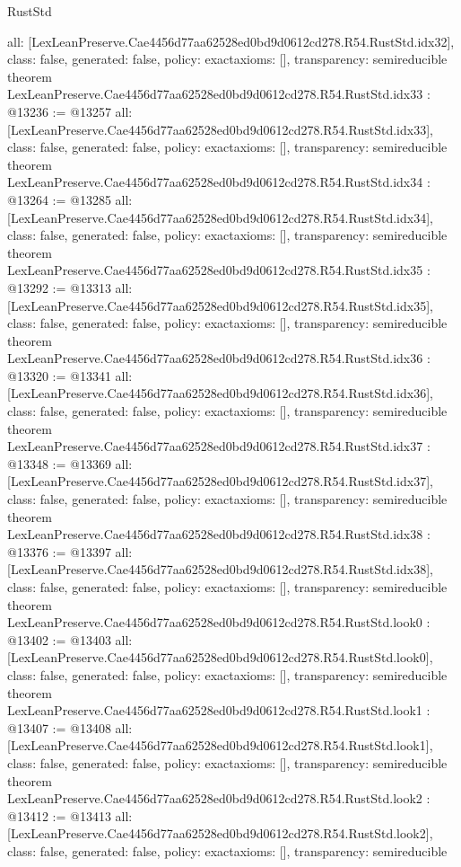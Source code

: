 \begin{lexlean}{RustStd}
\begin{coremodule}
{  all: [LexLeanPreserve.Cae4456d77aa62528ed0bd9d0612cd278.R54.RustStd.idx32],
  class: false,
  generated: false,
  policy: exact{axioms: []},
  transparency: semireducible
}
theorem LexLeanPreserve.Cae4456d77aa62528ed0bd9d0612cd278.R54.RustStd.idx33 : @13236 := @13257 {
  all: [LexLeanPreserve.Cae4456d77aa62528ed0bd9d0612cd278.R54.RustStd.idx33],
  class: false,
  generated: false,
  policy: exact{axioms: []},
  transparency: semireducible
}
theorem LexLeanPreserve.Cae4456d77aa62528ed0bd9d0612cd278.R54.RustStd.idx34 : @13264 := @13285 {
  all: [LexLeanPreserve.Cae4456d77aa62528ed0bd9d0612cd278.R54.RustStd.idx34],
  class: false,
  generated: false,
  policy: exact{axioms: []},
  transparency: semireducible
}
theorem LexLeanPreserve.Cae4456d77aa62528ed0bd9d0612cd278.R54.RustStd.idx35 : @13292 := @13313 {
  all: [LexLeanPreserve.Cae4456d77aa62528ed0bd9d0612cd278.R54.RustStd.idx35],
  class: false,
  generated: false,
  policy: exact{axioms: []},
  transparency: semireducible
}
theorem LexLeanPreserve.Cae4456d77aa62528ed0bd9d0612cd278.R54.RustStd.idx36 : @13320 := @13341 {
  all: [LexLeanPreserve.Cae4456d77aa62528ed0bd9d0612cd278.R54.RustStd.idx36],
  class: false,
  generated: false,
  policy: exact{axioms: []},
  transparency: semireducible
}
theorem LexLeanPreserve.Cae4456d77aa62528ed0bd9d0612cd278.R54.RustStd.idx37 : @13348 := @13369 {
  all: [LexLeanPreserve.Cae4456d77aa62528ed0bd9d0612cd278.R54.RustStd.idx37],
  class: false,
  generated: false,
  policy: exact{axioms: []},
  transparency: semireducible
}
theorem LexLeanPreserve.Cae4456d77aa62528ed0bd9d0612cd278.R54.RustStd.idx38 : @13376 := @13397 {
  all: [LexLeanPreserve.Cae4456d77aa62528ed0bd9d0612cd278.R54.RustStd.idx38],
  class: false,
  generated: false,
  policy: exact{axioms: []},
  transparency: semireducible
}
theorem LexLeanPreserve.Cae4456d77aa62528ed0bd9d0612cd278.R54.RustStd.look0 : @13402 := @13403 {
  all: [LexLeanPreserve.Cae4456d77aa62528ed0bd9d0612cd278.R54.RustStd.look0],
  class: false,
  generated: false,
  policy: exact{axioms: []},
  transparency: semireducible
}
theorem LexLeanPreserve.Cae4456d77aa62528ed0bd9d0612cd278.R54.RustStd.look1 : @13407 := @13408 {
  all: [LexLeanPreserve.Cae4456d77aa62528ed0bd9d0612cd278.R54.RustStd.look1],
  class: false,
  generated: false,
  policy: exact{axioms: []},
  transparency: semireducible
}
theorem LexLeanPreserve.Cae4456d77aa62528ed0bd9d0612cd278.R54.RustStd.look2 : @13412 := @13413 {
  all: [LexLeanPreserve.Cae4456d77aa62528ed0bd9d0612cd278.R54.RustStd.look2],
  class: false,
  generated: false,
  policy: exact{axioms: []},
  transparency: semireducible
}
\end{coremodule}
\end{lexlean}
